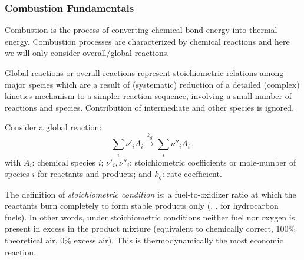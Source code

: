 \subsubsection{Combustion Fundamentals}
Combustion is the process of converting chemical bond energy into thermal energy. Combustion processes are characterized by chemical reactions and here we will only consider overall/global reactions.

Global reactions or overall reactions represent stoichiometric relations among major species which are a result of (systematic) reduction of a detailed (complex) kinetics mechanism to a simpler reaction sequence, involving a small number of reactions and species. Contribution of intermediate and other species is ignored.

Consider a global reaction:
\begin{equation}
  \sum_i\nu'_i A_i \overset{k_g}{\rightarrow} \sum_i \nu''_i A_i\,,
\end{equation}
with $A_i$: chemical species $i$; $\nu'_i, \nu''_i$: stoichiometric coefficients or mole-number of species $i$ for reactants and products; and $k_g$: rate coefficient.

The definition of {\it stoichiometric condition} is: a fuel-to-oxidizer ratio at which the reactants burn completely to form stable products only (, , for hydrocarbon fuels). In other words, under stoichiometric conditions neither fuel nor oxygen is present in excess in the product mixture (equivalent to chemically correct, 100\% theoretical air, 0\% excess air). This is thermodynamically the most economic reaction.

